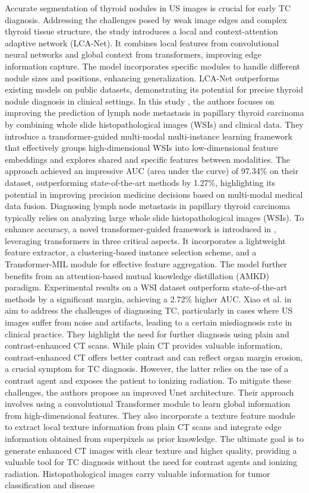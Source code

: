 \documentclass[a4paper,fleqn]{cas-sc}
\begin{document}
Accurate segmentation of thyroid nodules in \ac{US} images is crucial for early TC diagnosis. Addressing the challenges posed by weak image edges and complex thyroid tissue structure, the study \cite{tao2022local} introduces a local and context-attention adaptive network (LCA-Net). It combines local features from convolutional neural networks and global context from transformers, improving edge information capture. The model incorporates specific modules to handle different nodule sizes and positions, enhancing generalization. LCA-Net outperforms existing models on public datasets, demonstrating its potential for precise thyroid nodule diagnosis in clinical settings.  In this study \cite{wang2023shared}, the authors focuses on improving the prediction of lymph node metastasis in papillary thyroid carcinoma by combining whole slide histopathological images (WSIs) and clinical data. They introduce a transformer-guided multi-modal multi-instance learning framework that effectively groups high-dimensional WSIs into low-dimensional feature embeddings and explores shared and specific features between modalities. The approach achieved an impressive AUC (area under the curve) of 97.34\% on their dataset, outperforming state-of-the-art methods by 1.27\%, highlighting its potential in improving precision medicine decisions based on multi-modal medical data fusion. Diagnosing lymph node metastasis in papillary thyroid carcinoma typically relies on analyzing large whole slide histopathological images (WSIs). To enhance accuracy, a novel transformer-guided framework is introduced in \cite{wang2022lymph}, leveraging transformers in three critical aspects. It incorporates a lightweight feature extractor, a clustering-based instance selection scheme, and a Transformer-MIL module for effective feature aggregation. The model further benefits from an attention-based mutual knowledge distillation (AMKD) paradigm. Experimental results on a WSI dataset outperform state-of-the-art methods by a significant margin, achieving a 2.72\% higher AUC. Xiao et al. in \cite{xiao2022contrast} aim to address the challenges of diagnosing TC, particularly in cases where \ac{US} images suffer from noise and artifacts, leading to a certain misdiagnosis rate in clinical practice. They highlight the need for further diagnosis using plain and contrast-enhanced \ac{CT} scans. While plain \ac{CT} provides valuable information, contrast-enhanced \ac{CT} offers better contrast and can reflect organ margin erosion, a crucial symptom for TC diagnosis. However, the latter relies on the use of a contrast agent and exposes the patient to ionizing radiation. To mitigate these challenges, the authors propose an improved Unet architecture. Their approach involves using a convolutional Transformer module to learn global information from high-dimensional features. They also incorporate a texture feature module to extract local texture information from plain \ac{CT} scans and integrate edge information obtained from superpixels as prior knowledge. The ultimate goal is to generate enhanced \ac{CT} images with clear texture and higher quality, providing a valuable tool for TC diagnosis without the need for contrast agents and ionizing radiation. Histopathological images carry valuable information for tumor classification and disease 
\end{document}
